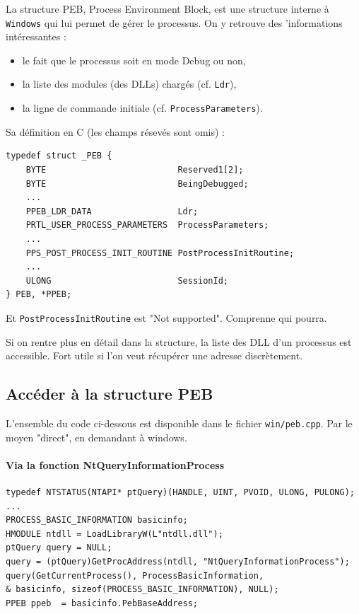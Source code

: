 \documentclass{book}
\newcommand{\code}[1]{\texttt{#1}}
\newcommand{\Windows}{{\sc windows}}
\begin{document}
La structure PEB, Process Environment Block, est une structure interne à \code{Windows} qui lui permet de gérer le processus. On y retrouve des 'informations intéressantes : 
\begin{itemize}
	\item le fait que le processus soit en mode Debug ou non, 
	\item la liste des modules (des DLLs) chargés (cf. \code{Ldr}),
	\item la ligne de commande initiale (cf. \code{ProcessParameters}).
\end{itemize}

Sa définition en C (les champs résevés sont omis) : 
\begin{verbatim}
typedef struct _PEB {
	BYTE                          Reserved1[2];
	BYTE                          BeingDebugged;
	...
	PPEB_LDR_DATA                 Ldr;
	PRTL_USER_PROCESS_PARAMETERS  ProcessParameters;
	...
	PPS_POST_PROCESS_INIT_ROUTINE PostProcessInitRoutine;
	...
	ULONG                         SessionId;
} PEB, *PPEB;
\end{verbatim}

Et \code{PostProcessInitRoutine} est "Not supported". Comprenne qui pourra. 

Si on rentre plus en détail dans la structure, la liste des DLL d'un processus est accessible. Fort utile si l'on veut récupérer une adresse discrètement.  

\subsection{Accéder à la structure PEB}

L'ensemble du code ci-dessous est disponible dans le fichier \code{win/peb.cpp}. Par le moyen "direct", en demandant à \Windows. 

\paragraph{Via la fonction NtQueryInformationProcess}

\begin{verbatim}
typedef NTSTATUS(NTAPI* ptQuery)(HANDLE, UINT, PVOID, ULONG, PULONG);
...
PROCESS_BASIC_INFORMATION basicinfo;
HMODULE ntdll = LoadLibraryW(L"ntdll.dll");
ptQuery query = NULL;
query = (ptQuery)GetProcAddress(ntdll, "NtQueryInformationProcess");
query(GetCurrentProcess(), ProcessBasicInformation, 
& basicinfo, sizeof(PROCESS_BASIC_INFORMATION), NULL);
PPEB ppeb  = basicinfo.PebBaseAddress;
\end{verbatim}
\end{document}
